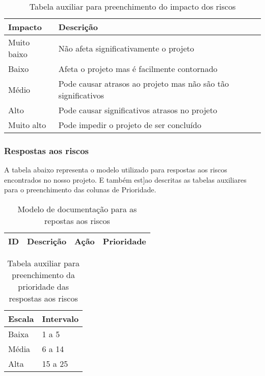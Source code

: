         \begin{table}[h]
            \centering
            \begin{tabular}{|p{3cm}|p{3cm}|}
            \hline
            \textbf{Impacto}  & \textbf{Descrição} \\ \hline
            Muito baixo & Não afeta significativamente o projeto \\ \hline
            Baixo & Afeta o projeto mas é facilmente contornado \\ \hline
            Médio & Pode causar atrasos ao projeto mas não são tão significativos \\ \hline
            Alto & Pode causar significativos atrasos no projeto \\ \hline
            Muito alto & Pode impedir o projeto de ser concluído \\ \hline
        \end{tabular}
            \caption{Tabela auxiliar para preenchimento do impacto dos riscos}
            \end{table}

\subsubsection{Respostas aos riscos}
A tabela abaixo representa o modelo utilizado para respostas aos riscos encontrados no nosso projeto. E também est]ao descritas as tabelas auxiliares para o preenchimento das colunas de Prioridade.

\begin{table}[h]
    \centering
    \begin{tabular}{|p{3cm}|p{3cm}|p{3cm}|p{3cm}|}
    \hline
    \textbf{ID}  & \textbf{Descrição} & \textbf{Ação} & \textbf{Prioridade} \\ \hline
\end{tabular}
    \caption{Modelo de documentação para as repostas aos riscos}
    \end{table}

\begin{table}[h]
    \centering
    \begin{tabular}{|p{3cm}|p{3cm}|}
    \hline
    \textbf{Escala}  & \textbf{Intervalo} \\ \hline
    Baixa & 1 a 5 \\ \hline
    Média & 6 a 14 \\ \hline
    Alta & 15 a 25 \\ \hline
\end{tabular}
    \caption{Tabela auxiliar para preenchimento da prioridade das respostas aos riscos}
    \end{table}

            